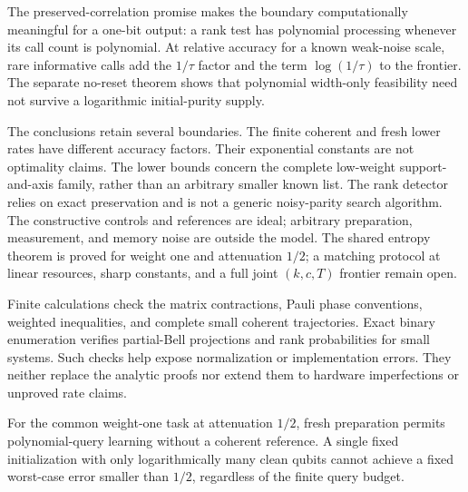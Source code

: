\documentclass[11pt,a4paper]{article}
\numberwithin{equation}{section}
\theoremstyle{definition}
\theoremstyle{remark}
\begin{document}
The preserved-correlation promise makes the boundary computationally meaningful for a one-bit output: a rank test has polynomial processing whenever its call count is polynomial. At relative accuracy for a known weak-noise scale, rare informative calls add the \(1/\tau\) factor and the term \(\log(1/\tau)\) to the frontier. The separate no-reset theorem shows that polynomial width-only feasibility need not survive a logarithmic initial-purity supply.

The conclusions retain several boundaries. The finite coherent and fresh lower rates have different accuracy factors. Their exponential constants are not optimality claims. The lower bounds concern the complete low-weight support-and-axis family, rather than an arbitrary smaller known list. The rank detector relies on exact preservation and is not a generic noisy-parity search algorithm. The constructive controls and references are ideal; arbitrary preparation, measurement, and memory noise are outside the model. The shared entropy theorem is proved for weight one and attenuation \(1/2\); a matching protocol at linear resources, sharp constants, and a full joint \((k,c,T)\) frontier remain open.

Finite calculations check the matrix contractions, Pauli phase conventions, weighted inequalities, and complete small coherent trajectories. Exact binary enumeration verifies partial-Bell projections and rank probabilities for small systems. Such checks help expose normalization or implementation errors. They neither replace the analytic proofs nor extend them to hardware imperfections or unproved rate claims.

For the common weight-one task at attenuation \(1/2\), fresh preparation permits polynomial-query learning without a coherent reference. A single fixed initialization with only logarithmically many clean qubits cannot achieve a fixed worst-case error smaller than \(1/2\), regardless of the finite query budget.
\end{document}

